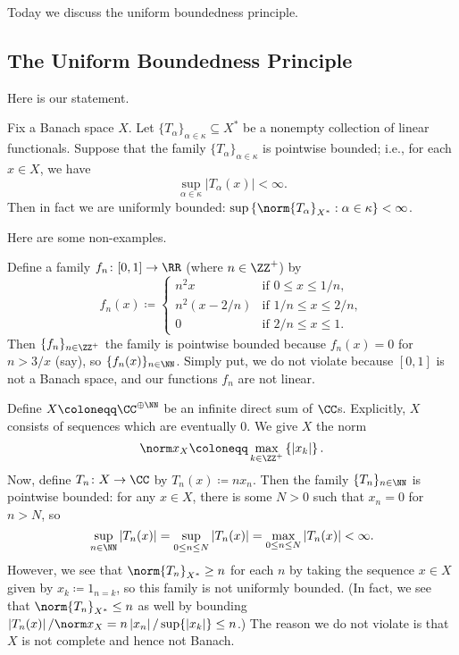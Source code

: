 \documentclass[../notes.tex]{subfiles}
\begin{document}
Today we discuss the uniform boundedness principle.

\subsection{The Uniform Boundedness Principle}
Here is our statement.
\begin{theorem} \label{thm:ubp}
	Fix a Banach space $X$. Let $\{T_\alpha\}_{\alpha\in\kappa}\subseteq X^*$ be a non\-empty collection of linear functionals. Suppose that the family $\{T_\alpha\}_{\alpha\in\kappa}$ is pointwise bounded; i.e., for each $x\in X$, we have
	\[\sup_{\alpha\in\kappa}\left|T_\alpha(x)\right|<\infty.\]
	Then in fact we are uniformly bounded: $\sup\left\{\norm{T_\alpha}_{X^*}:\alpha\in\kappa\right\}<\infty$.
\end{theorem}
Here are some non-examples.
\begin{example}
	Define a family $f_n\colon[0,1]\to\RR$ (where $n\in\ZZ^+$) by
	\[f_n(x)\coloneqq\begin{cases}
		n^2x & \text{if }0\le x\le1/n, \\
		n^2(x-2/n) & \text{if }1/n\le x\le 2/n, \\
		0 & \text{if }2/n\le x\le 1.
	\end{cases}\]
	Then $\{f_n\}_{n\in\ZZ^+}$ the family is pointwise bounded because $f_n(x)=0$ for $n>3/x$ (say), so $\{f_n(x)\}_{n\in\NN}$. Simply put, we do not violate  because $[0,1]$ is not a Banach space, and our functions $f_n$ are not linear.
\end{example}
\begin{example}
	Define $X\coloneqq\CC^{\oplus\NN}$ be an infinite direct sum of $\CC$s. Explicitly, $X$ consists of sequences which are eventually $0$. We give $X$ the norm
	\[\norm x_X\coloneqq\max_{k\in\ZZ^+}\left\{\left|x_k\right|\right\}.\]
	Now, define $T_n\colon X\to\CC$ by $T_n(x)\coloneqq nx_n$. Then the family $\{T_n\}_{n\in\NN}$ is pointwise bounded: for any $x\in X$, there is some $N>0$ such that $x_n=0$ for $n>N$, so
	\[\sup_{n\in\NN}\left|T_n(x)\right|=\sup_{0\le n\le N}\left|T_n(x)\right|=\max_{0\le n\le N}\left|T_n(x)\right|<\infty.\]
	However, we see that $\norm{T_n}_{X^*}\ge n$ for each $n$ by taking the sequence $x\in X$ given by $x_k\coloneqq1_{n=k}$, so this family is not uniformly bounded. (In fact, we see that $\norm{T_n}_{X^*}\le n$ as well by bounding $\left|T_n(x)\right|/\norm x_X=n\left|x_n\right|/\sup\{\left|x_k\right|\}\le n$.) The reason we do not violate  is that $X$ is not complete and hence not Banach.
\end{example}
\end{document}
